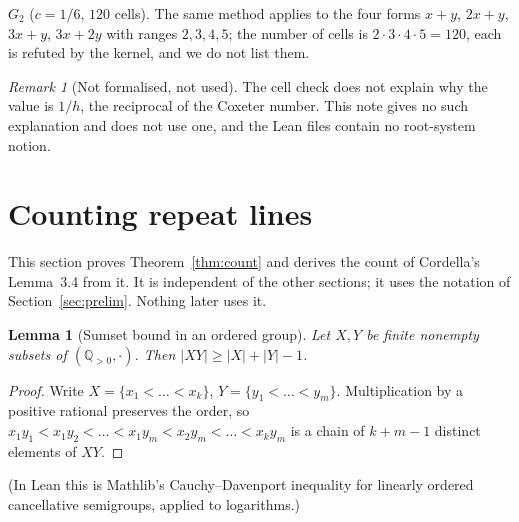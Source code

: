 \documentclass[11pt]{amsart}
\newtheorem{lemma}[theorem]{Lemma}
\theoremstyle{definition}
\theoremstyle{remark}
\newtheorem{remark}[theorem]{Remark}
\newcommand{\Q}{\mathbb{Q}}
\begin{document}
\emph{$G_2$} ($c=1/6$, $120$ cells). The same method applies to the four forms $x+y$, $2x+y$, $3x+y$, $3x+2y$ with ranges $2,3,4,5$; the number of cells is $2\cdot3\cdot4\cdot5=120$, each is refuted by the kernel, and we do not list them.

\begin{remark}[Not formalised, not used]
The cell check does not explain why the value is $1/h$, the reciprocal of the Coxeter number. This note gives no such explanation and does not use one, and the Lean files contain no root-system notion.
\end{remark}

\section{Counting repeat lines}\label{sec:count}

This section proves Theorem~\ref{thm:count} and derives the count of Cordella's Lemma~3.4 from it. It is independent of the other sections; it uses the notation of Section~\ref{sec:prelim}. Nothing later uses it.

\begin{lemma}[Sumset bound in an ordered group]\label{lem:ordered}
Let $X,Y$ be finite nonempty subsets of $(\Q_{>0},\cdot)$. Then $|XY|\ge|X|+|Y|-1$.
\end{lemma}
\begin{proof}
Write $X=\{x_1<\dots<x_k\}$, $Y=\{y_1<\dots<y_m\}$. Multiplication by a positive rational preserves the order, so $x_1y_1<x_1y_2<\dots<x_1y_m<x_2y_m<\dots<x_ky_m$ is a chain of $k+m-1$ distinct elements of $XY$.
\end{proof}
(In Lean this is Mathlib's Cauchy--Davenport inequality for linearly ordered cancellative semigroups, applied to logarithms.)
\end{document}
